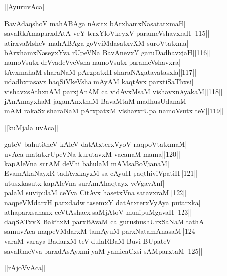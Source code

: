 \documentclass{article}
\begin{document}
\begin{center}
||AyuruvAca||
\end{center}

BavAdaqshoV mahABAga nAsitx bArxhamxNasatatxmaH|\\
savaRkAmaparxdAtA veY terxYloVkeyxV parameVshavxraH||115||\\
atirxvaMsheV mahABAga goVviMdasatxvXM suroVtatxma|\\
bArxhamxNaseyxYva rUpeVNa BavAnevxY garuDadhavxjaH||116||\\
namoVsutx deVvadeVveVsha namoVsutx parameVshavxra|\\
tAvxmahaM sharaNaM pArxpatxH sharaNAgatavatasxla||117||\\
udadhxrasavx haqSiVkeVsha mAyAM kaqtAvx parxtiSaThxsi|\\
vishavxsAthxnAM parxjAnAM ca vidAvxMsaM vishavxnAyakaM||118||\\
jAnAmayxhaM jaganAnxthaM BavaMtaM madhusUdanaM|\\
mAM rakaSx sharaNaM pArxpatxM vishavxrUpa namoVsutx teV||119||\\

\begin{center}
||kuMjala uvAca||
\end{center}

gateV bahutitheV kAleV datAtxterxVyoV naqpoVtatxmaM|\\
uvAca matatxrUpeVNa kurutavxM vacanaM mama||120||\\
kapAleVna surAM deVhi bahulaM mAMsaBoVjanaM|\\
EvamAkaNayxR tadAvxkayxM sa cAyuH paqthiviVpatiH||121||\\
utusxkasutx kapAleVna surAmAhaqtayx veVgavAnf|\\
palaM suvipulaM ceYva CitAvx hasetxVna satavxraM||122||\\
naqpeVMdarxH parxdadw tasemxY datAtxterxVyAya putarxka|\\
athaparxsananx ceVtAshacx saMjAtoV munipuMgavaH||123||\\
daqSATxvX BakitxM parxBAvaM ca gurushushUrxSaNaM tathA|\\
samuvAca naqpeVMdarxM tamAyuM parxNatamAnasaM||124||\\
varaM varaya BadarxM teV dulaRBaM Buvi BUpateV|\\
savaRmeVva parxdAsAyxmi yaM yamicaCxsi sAMparxtaM||125||\\

\begin{center}
||rAjoVvAca||
\end{center}
\end{document}
